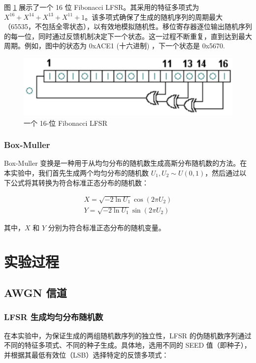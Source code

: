 \documentclass[a4paper]{article}  %
\begin{document}
图 \ref{fig:lfsr_model} 展示了一个 16 位 Fibonacci LFSR。其采用的特征多项式为 $X^{16} + X^{14} + X^{13} + X^{11} + 1$。该多项式确保了生成的随机序列的周期最大（65535，不包括全零状态），以有效地模拟随机性。移位寄存器逐位输出随机序列的每一位，同时通过反馈机制决定下一个状态。这一过程不断重复，直到达到最大周期。例如，图中的状态为 0xACE1 (十六进制) ，下一个状态是 0x5670.

\begin{figure}[ht]
    \centering
    \includegraphics[width=.6\textwidth]{static/lfsr_model.png}
    \caption{一个 16-位 Fibonacci LFSR}
    \label{fig:lfsr_model}
\end{figure}

\subsubsection{Box-Muller}

Box-Muller 变换是一种用于从均匀分布的随机数生成高斯分布随机数的方法。在本实验中，我们首先生成两个均匀分布的随机数 $U_1, U_2 \sim U(0, 1)$，然后通过以下公式将其转换为符合标准正态分布的随机数：

$$
\begin{aligned}
X = \sqrt{-2\ln U_1} \cos(2\pi U_2) \\
Y = \sqrt{-2\ln U_1} \sin(2\pi U_2)
\end{aligned}
$$

其中，$X$ 和 $Y$ 分别为符合标准正态分布的随机变量。


\section{实验过程}

\subsection{AWGN 信道}

\subsubsection{LFSR 生成均匀分布随机数}

在本实验中，为保证生成的两组随机数序列的独立性，LFSR 的伪随机数序列通过不同的特征多项式、不同的种子生成。具体地，选用不同的 SEED 值（即种子），并根据其最低有效位（LSB）选择特定的反馈多项式：
\end{document}
